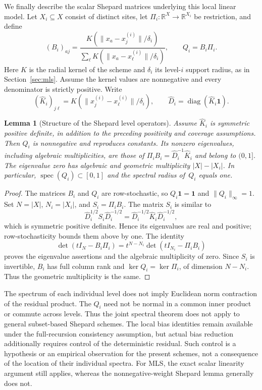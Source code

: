 \documentclass[12pt]{article}
\newtheorem{lemma}[theorem]{Lemma}
\begin{document}
We finally describe the scalar Shepard matrices underlying this local linear model. Let $X_i\subseteq X$ consist of distinct sites, let $\Pi_i:\mathbb R^X\to\mathbb R^{X_i}$ be restriction, and define
\[
 (B_i)_{aj}=
 \frac{K(\|x_a-x_j^{(i)}\|/\delta_i)}
 {\sum_{\ell}K(\|x_a-x_\ell^{(i)}\|/\delta_i)},
 \qquad Q_i=B_i\Pi_i.
\]
Here $K$ is the radial kernel of the scheme and $\delta_i$ its level-$i$ support radius, as in Section~\ref{sec:mls}. Assume the kernel values are nonnegative and every denominator is strictly positive. Write
\[
 (\widehat K_i)_{j\ell}
 =K(\|x_j^{(i)}-x_\ell^{(i)}\|/\delta_i),
 \qquad \widehat D_i=\operatorname{diag}(\widehat K_i\mathbf1).
\]

\begin{lemma}[Structure of the Shepard level operators]
\label{lem:shepard-structure}
Assume $\widehat K_i$ is symmetric positive definite, in addition to the preceding positivity and coverage assumptions. Then $Q_i$ is nonnegative and reproduces constants. Its nonzero eigenvalues, including algebraic multiplicities, are those of $\Pi_iB_i=\widehat D_i^{-1}\widehat K_i$ and belong to $(0,1]$. The eigenvalue zero has algebraic and geometric multiplicity $|X|-|X_i|$. In particular, $\operatorname{spec}(Q_i)\subset[0,1]$ and the spectral radius of~$Q_i$ equals one.
\end{lemma}

\begin{proof}
The matrices $B_i$ and $Q_i$ are row-stochastic, so $Q_i\mathbf1=\mathbf1$ and $\|Q_i\|_\infty=1$. Set $N=|X|$, $N_i=|X_i|$, and $S_i=\Pi_iB_i$. The matrix $S_i$ is similar to
\[
 \widehat D_i^{1/2}S_i\widehat D_i^{-1/2}
 =\widehat D_i^{-1/2}\widehat K_i\widehat D_i^{-1/2},
\]
which is symmetric positive definite. Hence its eigenvalues are real and positive; row-stochasticity bounds them above by one. The identity
\[
 \det(tI_N-B_i\Pi_i)=t^{N-N_i}\det(tI_{N_i}-\Pi_iB_i)
\]
proves the eigenvalue assertions and the algebraic multiplicity of zero. Since $S_i$ is invertible, $B_i$ has full column rank and $\ker Q_i=\ker\Pi_i$, of dimension $N-N_i$. Thus the geometric multiplicity is the same.
\end{proof}

The spectrum of each individual level does not imply Euclidean norm contraction of the residual product. The $Q_i$ need not be normal in a common inner product or commute across levels. Thus the joint spectral theorem does not apply to general subset-based Shepard schemes. The local bias identities remain available under the full-recursion consistency assumption, but actual bias reduction additionally requires control of the deterministic residual. Such control is a hypothesis or an empirical observation for the present schemes, not a consequence of the location of their individual spectra. For MLS, the exact scalar linearity argument still applies, whereas the nonnegative-weight Shepard lemma generally does not.
\end{document}
